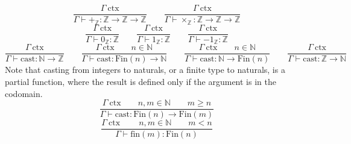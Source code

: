 \documentclass[11pt]{article}
\begin{document}
\begin{equation}
	\frac{\Gamma\ \text{ctx}}
	{\Gamma \vdash +_{\mathbb{Z}} : \mathbb{Z} \to \mathbb{Z} \to \mathbb{Z}}
	\qquad
	\frac{\Gamma\ \text{ctx}}
	{\Gamma \vdash \times_{\mathbb{Z}} : \mathbb{Z} \to \mathbb{Z} \to \mathbb{Z}}
\end{equation}
\begin{equation}
	\frac{\Gamma\ \text{ctx}}
	{\Gamma \vdash 0_{\mathbb{Z}} : \mathbb{Z}}
	\qquad
	\frac{\Gamma\ \text{ctx}}
	{\Gamma \vdash 1_{\mathbb{Z}} : \mathbb{Z}}
	\qquad
	\frac{\Gamma\ \text{ctx}}
	{\Gamma \vdash -1_{\mathbb{Z}} : \mathbb{Z}}
\end{equation}
\begin{equation}
	\frac{\Gamma\ \text{ctx}}
	{\Gamma \vdash \text{cast} : \mathbb{N} \to \mathbb{Z}}
	\qquad
	\frac{\Gamma\ \text{ctx} \qquad n \in \mathbb{N}}
	{\Gamma \vdash \text{cast} : \text{Fin}(n) \to \mathbb{N}}
	\qquad
	\frac{\Gamma\ \text{ctx} \qquad n \in \mathbb{N}}
	{\Gamma \vdash \text{cast} : \mathbb{N} \to \text{Fin}(n)}
	\qquad
	\frac{\Gamma\ \text{ctx}}
	{\Gamma \vdash \text{cast} : \mathbb{Z} \to \mathbb{N}}
\end{equation}
Note that casting from integers to naturals, or a finite type to naturals,
is a partial function, where the result is defined only if the argument is
in the codomain.
\begin{equation}
	\frac{\Gamma\ \text{ctx} \qquad n, m \in \mathbb{N} \qquad m \geq n}
	{\Gamma \vdash \text{cast} : \text{Fin}(n) \to \text{Fin}(m)}
\end{equation}
\begin{equation}
	\frac{\Gamma\ \text{ctx}\ \qquad n, m \in \mathbb{N} \qquad m < n}
	{\Gamma \vdash \text{fin}(m) : \text{Fin}(n)}
\end{equation}
\end{document}
